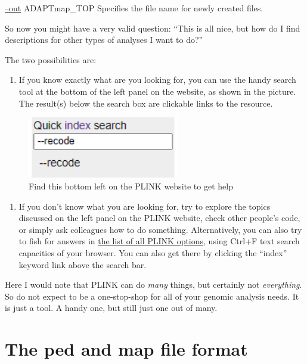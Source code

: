 \documentclass[]{book}
\providecommand{\tightlist}{%
  \setlength{\itemsep}{0pt}\setlength{\parskip}{0pt}}
\begin{document}
\href{https://www.cog-genomics.org/plink/1.9/general_usage\#out}{--out}
ADAPTmap\_TOP Specifies the file name for newly created files.

So now you might have a very valid question: ``This is all nice, but how
do I find descriptions for other types of analyses I want to do?''

The two possibilities are:

\begin{enumerate}
\def\labelenumi{\arabic{enumi})}
\tightlist
\item
  If you know exactly what are you looking for, you can use the handy
  search tool at the bottom of the left panel on the website, as shown
  in the picture. The result(s) below the search box are clickable links
  to the resource.
\end{enumerate}

\begin{figure}
\includegraphics[width=2.61in]{images/7-2-plinkHelpSearch} \caption{Find this bottom left on the PLINK website to get help}\label{fig:fig7-2}
\end{figure}

\begin{enumerate}
\def\labelenumi{\arabic{enumi})}
\setcounter{enumi}{1}
\tightlist
\item
  If you don't know what you are looking for, try to explore the topics
  discussed on the left panel on the PLINK website, check other people's
  code, or simply ask colleagues how to do something. Alternatively, you
  can also try to fish for answers in
  \href{https://www.cog-genomics.org/plink/1.9/index}{the list of all
  PLINK options}, using Ctrl+F text search capacities of your browser.
  You can also get there by clicking the ``index'' keyword link above
  the search bar.
\end{enumerate}

Here I would note that PLINK can do \emph{many} things, but certainly
not \emph{everything}. So do not expect to be a one-stop-shop for all of
your genomic analysis needs. It is just a tool. A handy one, but still
just one out of many.

\section{The ped and map file format}\label{the-ped-and-map-file-format}
\end{document}
